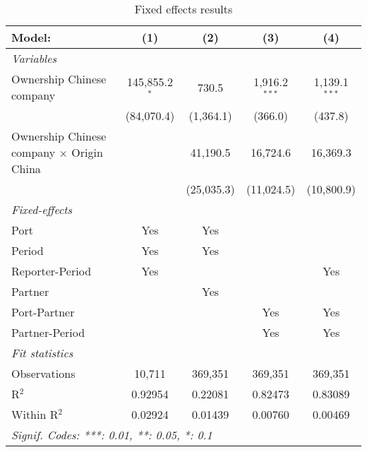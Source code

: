 \begin{table}[htbp]    \caption{\label{tab:fe_results} Fixed effects results}    \centering    \begin{adjustbox}{width = \textwidth, center}       \begin{tabular}{lcccc}          \tabularnewline \midrule \midrule          Model:                                           & (1)             & (2)        & (3)             & (4)\\            \midrule          \emph{Variables}\\          Ownership Chinese company                        & 145,855.2$^{*}$ & 730.5      & 1,916.2$^{***}$ & 1,139.1$^{***}$\\                                                              & (84,070.4)      & (1,364.1)  & (366.0)         & (437.8)\\             Ownership Chinese company $\times$ Origin China  &                 & 41,190.5   & 16,724.6        & 16,369.3\\                                                              &                 & (25,035.3) & (11,024.5)      & (10,800.9)\\             \midrule          \emph{Fixed-effects}\\          Port                                             & Yes             & Yes        &                 & \\            Period                                           & Yes             & Yes        &                 & \\            Reporter-Period                                  & Yes             &            &                 & Yes\\            Partner                                          &                 & Yes        &                 & \\            Port-Partner                                     &                 &            & Yes             & Yes\\            Partner-Period                                   &                 &            & Yes             & Yes\\            \midrule          \emph{Fit statistics}\\          Observations                                     & 10,711          & 369,351    & 369,351         & 369,351\\            R$^2$                                            & 0.92954         & 0.22081    & 0.82473         & 0.83089\\            Within R$^2$                                     & 0.02924         & 0.01439    & 0.00760         & 0.00469\\            \midrule \midrule          \multicolumn{5}{l}{\emph{Signif. Codes: ***: 0.01, **: 0.05, *: 0.1}}\\       \end{tabular}    \end{adjustbox} \end{table}